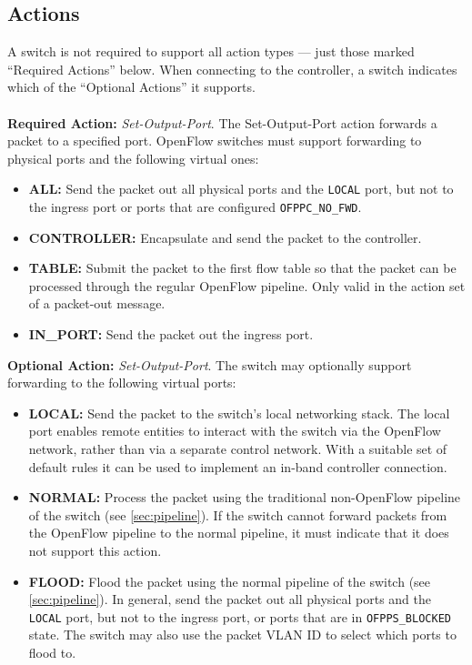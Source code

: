 \documentclass[10pt]{article}
\begin{document}
\subsection{Actions}
\label{ft:actions}
A switch is not required to support all action types --- just those marked ``Required Actions'' below. When connecting to the controller, a switch indicates which of the ``Optional Actions'' it supports.
\\\\
\textbf{Required Action:} \textit{Set-Output-Port}.
The Set-Output-Port action forwards a packet to a specified port. OpenFlow switches must support forwarding to physical ports and the following virtual ones:
\begin{itemize}
\item \textbf{ALL:} Send the packet out all physical ports and the \verb|LOCAL| port, but not to the ingress port or ports that are configured \verb|OFPPC_NO_FWD|.
\item \textbf{CONTROLLER:} Encapsulate and send the packet to the controller.
\item \textbf{TABLE:} Submit the packet to the first flow table so that the packet can be processed through the regular OpenFlow pipeline.  Only valid in the action set of a packet-out message.
\item \textbf{IN\_PORT:} Send the packet out the ingress port. 
\end{itemize}
\textbf{Optional Action:} \textit{Set-Output-Port}.
The switch may optionally support forwarding to the following virtual ports:
\begin{itemize}
\item \textbf{LOCAL:} Send the packet to the switch's local networking stack. The local port enables remote entities to interact with the switch via the OpenFlow network, rather than via a separate control network. With a suitable set of default rules it can be used to implement an in-band controller connection.
\item \textbf{NORMAL:} Process the packet using the traditional non-OpenFlow pipeline of the switch (see \ref{sec:pipeline}). If the switch cannot forward packets from the OpenFlow pipeline to the normal pipeline, it must indicate that it does not support this action.
\item \textbf{FLOOD:} Flood the packet using the normal pipeline of the switch (see \ref{sec:pipeline}). In general, send the packet out all physical ports and the \verb|LOCAL| port, but not to the ingress port, or ports that are in \verb|OFPPS_BLOCKED| state. The switch may also use the packet VLAN ID to select which ports to flood to.

\end{itemize}
\end{document}
